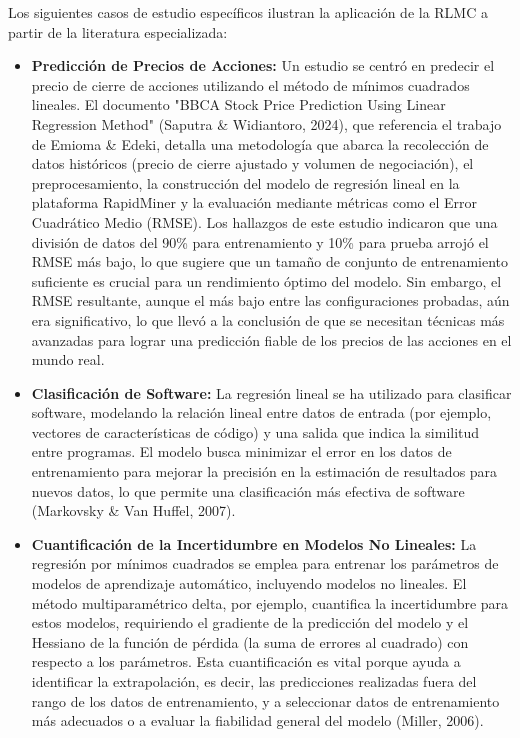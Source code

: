 \documentclass[12pt]{article}
\begin{document}
        \noindent
        Los siguientes casos de estudio específicos ilustran la aplicación de la RLMC a partir de la literatura especializada:
        \begin{itemize}
                \item \textbf{Predicción de Precios de Acciones:} Un estudio se centró en predecir el precio de cierre de acciones utilizando el método de mínimos cuadrados lineales. El documento "BBCA Stock Price Prediction Using Linear Regression Method" (Saputra \& Widiantoro, 2024), que referencia el trabajo de Emioma \& Edeki, detalla una metodología que abarca la recolección de datos históricos (precio de cierre ajustado y volumen de negociación), el preprocesamiento, la construcción del modelo de regresión lineal en la plataforma RapidMiner y la evaluación mediante métricas como el Error Cuadrático Medio (RMSE). Los hallazgos de este estudio indicaron que una división de datos del 90\% para entrenamiento y 10\% para prueba arrojó el RMSE más bajo, lo que sugiere que un tamaño de conjunto de entrenamiento suficiente es crucial para un rendimiento óptimo del modelo. Sin embargo, el RMSE resultante, aunque el más bajo entre las configuraciones probadas, aún era significativo, lo que llevó a la conclusión de que se necesitan técnicas más avanzadas para lograr una predicción fiable de los precios de las acciones en el mundo real.
                \item \textbf{Clasificación de Software:} La regresión lineal se ha utilizado para clasificar software, modelando la relación lineal entre datos de entrada (por ejemplo, vectores de características de código) y una salida que indica la similitud entre programas. El modelo busca minimizar el error en los datos de entrenamiento para mejorar la precisión en la estimación de resultados para nuevos datos, lo que permite una clasificación más efectiva de software (Markovsky \& Van Huffel, 2007).
                \item \textbf{Cuantificación de la Incertidumbre en Modelos No Lineales:} La regresión por mínimos cuadrados se emplea para entrenar los parámetros de modelos de aprendizaje automático, incluyendo modelos no lineales. El método multiparamétrico delta, por ejemplo, cuantifica la incertidumbre para estos modelos, requiriendo el gradiente de la predicción del modelo y el Hessiano de la función de pérdida (la suma de errores al cuadrado) con respecto a los parámetros. Esta cuantificación es vital porque ayuda a identificar la extrapolación, es decir, las predicciones realizadas fuera del rango de los datos de entrenamiento, y a seleccionar datos de entrenamiento más adecuados o a evaluar la fiabilidad general del modelo (Miller, 2006).
        \end{itemize}
        
\end{document}

